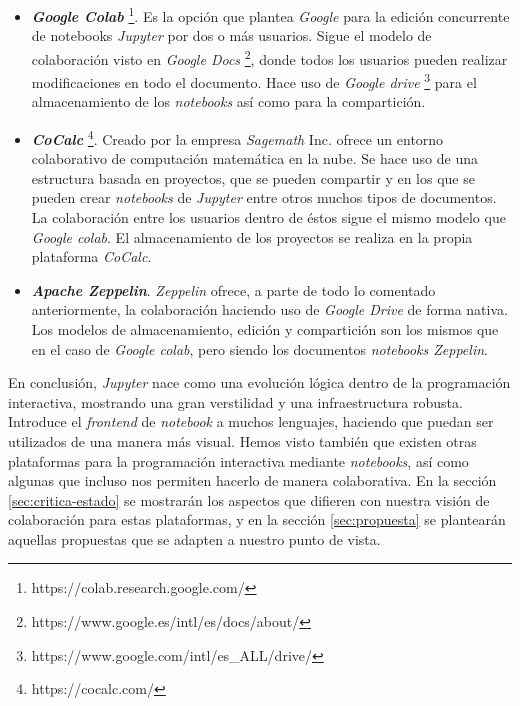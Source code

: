 \documentclass[11pt,spanish,listoffigures]{tfgetsinf}
\begin{document}
\begin{itemize}

\item \textbf{\textit{Google Colab}} \footnote{https://colab.research.google.com/}. Es la opción que plantea \textit{Google} para la edición concurrente de notebooks \textit{Jupyter} por dos o más usuarios. Sigue el modelo de colaboración visto en \textit{Google Docs} \footnote{https://www.google.es/intl/es/docs/about/}, donde todos los usuarios pueden realizar modificaciones en todo el documento. Hace uso de \textit{Google drive} \footnote{https://www.google.com/intl/es\_ALL/drive/} para el almacenamiento de los \textit{notebooks} así como para la compartición.

\item \textbf{\textit{CoCalc}} \footnote{https://cocalc.com/}. Creado por la empresa \textit{Sagemath} Inc. ofrece un entorno colaborativo de computación matemática en la nube. Se hace uso de una estructura basada en proyectos, que se pueden compartir y en los que se pueden crear \textit{notebooks} de \textit{Jupyter} entre otros muchos tipos de documentos. La colaboración entre los usuarios dentro de éstos sigue el mismo modelo que \textit{Google colab}. El almacenamiento de los proyectos se realiza en la propia plataforma \textit{CoCalc}.

\item \textbf{\textit{Apache Zeppelin}}. \textit{Zeppelin} ofrece, a parte de todo lo comentado anteriormente, la colaboración haciendo uso de \textit{Google Drive} de forma nativa. Los modelos de almacenamiento, edición y compartición son los mismos que en el caso de \textit{Google colab}, pero siendo los documentos \textit{notebooks Zeppelin}.

\end{itemize}

En conclusión, \textit{Jupyter} nace como una evolución lógica dentro de la programación interactiva, mostrando una gran verstilidad y una infraestructura robusta. Introduce el \textit{frontend} de \textit{notebook} a muchos lenguajes, haciendo que puedan ser utilizados de una manera más visual. Hemos visto también que existen otras plataformas para la programación interactiva mediante \textit{notebooks}, así como algunas que incluso nos permiten hacerlo de manera colaborativa. En la sección \ref{sec:critica-estado} se mostrarán los aspectos que difieren con nuestra visión de colaboración para estas plataformas, y en la sección  \ref{sec:propuesta} se plantearán aquellas propuestas que se adapten a nuestro punto de vista.
\end{document}
